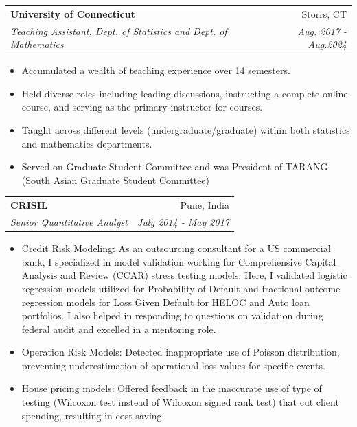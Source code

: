 \documentclass[letterpaper,11pt]{article}
\makeatletter
\newcommand{\resumeSubheading}[4]{
  \vspace{-1pt}\item
    \begin{tabular*}{0.97\textwidth}{l@{\extracolsep{\fill}}r}
      \textbf{#1} & #2 \\
      \textit{\small#3} & \textit{\small #4} \\
    \end{tabular*}\vspace{-5pt}
}
\makeatother
\begin{document}
    \resumeSubheading
    {University of Connecticut}{Storrs, CT}
    {Teaching Assistant, Dept. of Statistics and Dept. of Mathematics}{Aug. 2017 - Aug.2024}
      \begin{itemize}
          \item Accumulated a wealth of teaching experience over 14 semesters.
          \item Held diverse roles including leading discussions,
           instructing a complete online course, and serving as the primary instructor for courses.
          \item Taught across different levels (undergraduate/graduate) within both statistics and mathematics departments.
          \item Served on Graduate Student Committee and was President of TARANG (South Asian Graduate Student Committee)
      \end{itemize}

    \resumeSubheading
      {CRISIL}{Pune, India}
      {Senior Quantitative Analyst}{July 2014 - May 2017}
      \begin{itemize}
        \item Credit Risk Modeling: As an outsourcing consultant for a US commercial bank,
        I specialized in model validation working for Comprehensive
        Capital Analysis and Review (CCAR) stress testing models. Here, I
        validated logistic regression models utilized for Probability
        of Default and fractional outcome regression models for Loss
        Given Default for HELOC and Auto loan portfolios. I also helped in responding to questions on validation
         during federal audit and excelled in a mentoring role.
                 
        \item Operation Risk Models: Detected inappropriate use of Poisson distribution,
            preventing underestimation of operational loss values for
            specific events.
        \item House pricing models: Offered feedback in the inaccurate use of type of
        testing (Wilcoxon test instead of Wilcoxon signed rank
            test) that cut client spending, resulting in cost-saving.
      
    \end{itemize}
\end{document}
